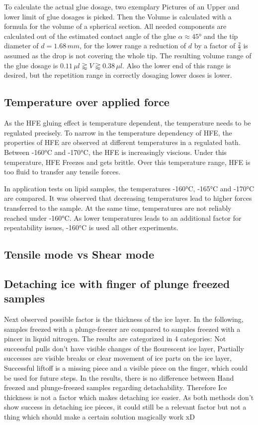 To calculate the actual glue dosage, two exemplary Pictures of an Upper and lower limit of glue dosages is picked. Then the Volume is calculated with a formula for the volume of a spherical section. All needed components are calculated out of the estimated contact angle of the glue $\alpha \approx 45°$ and the tip diameter of $d = 1.68\,mm$, for the lower range a reduction of $d$ by a factor of $\frac{2}{3}$ is assumed as the drop is not covering the whole tip. The resulting volume range of the glue dosage is $ 0.11\,\mu l \gtrapprox V \gtrapprox 0.38\,\mu l $. Also the lower end of this range is desired, but the repetition range in correctly dosaging lower doses is lower.

\subsection{Temperature over applied force}

As the HFE gluing effect is temperature dependent, the temperature needs to be regulated precisely. To narrow in the temperature dependency of HFE, the properties of HFE are observed at different temperatures in a regulated bath. Between -160°C and -170°C, the HFE is increasingly viscious. Under this temperature, HFE Freezes and gets brittle. Over this temperature range, HFE is too fluid to transfer any tensile forces. 

In application tests on lipid samples, the temperatures -160°C, -165°C and -170°C are compared. It was observed that decreasing temperatures lead to higher forces transferred to the sample. At the same time, temperatures are not reliably reached under -160°C.
As lower temperatures leads to an additional factor for repeatability issues, -160°C is used all other experiments.

\subsection{Tensile mode vs Shear mode}



\subsection{Detaching ice with finger of plunge freezed samples}

Next observed possible factor is the thickness of the ice layer. In the following, samples freezed with a plunge-freezer are compared to samples freezed with a pincer in liquid nitrogen. The results are categorized in 4 categories: Not successful pulls don't have visible changes of the flourescent ice layer, Partially successes are visible breaks or clear movement of ice parts on the ice layer, Successful liftoff is a missing piece and a visible piece on the finger, which could be used for future steps. In the results, there is no difference between Hand freezed and plunge-freezed samples regarding detachability. Therefore Ice thickness is not a factor which makes detaching ice easier. As both methods don't show success in detaching ice pieces, it could still be a relevant factor but not a thing which should make a certain solution magically work xD


